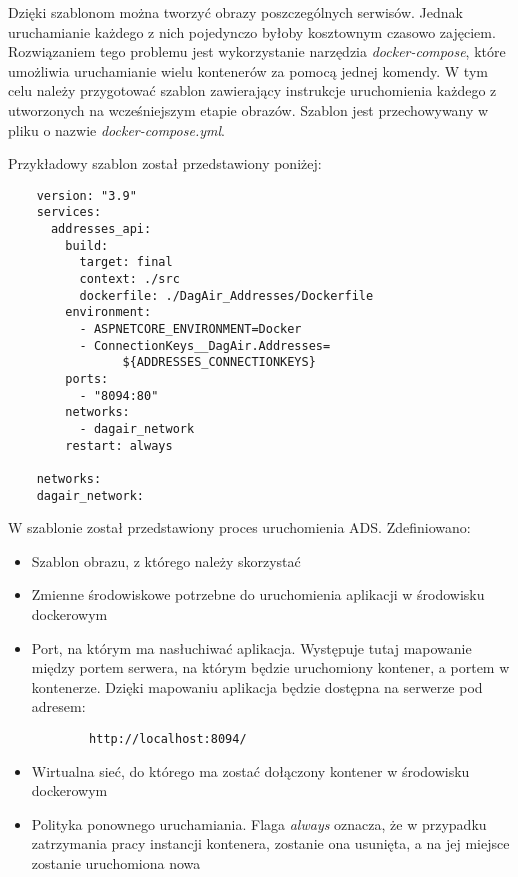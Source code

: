 Dzięki szablonom można tworzyć obrazy poszczególnych serwisów. Jednak uruchamianie każdego z nich
pojedynczo byłoby kosztownym czasowo zajęciem. Rozwiązaniem tego problemu jest wykorzystanie narzędzia
\textit{docker-compose}, które umożliwia uruchamianie wielu kontenerów za pomocą jednej komendy. W tym celu
należy przygotować szablon zawierający instrukcje uruchomienia każdego z utworzonych na wcześniejszym
etapie obrazów. Szablon jest przechowywany w pliku o nazwie \textit{docker-compose.yml}.

Przykładowy szablon został przedstawiony poniżej:

\begin{lstlisting}
    version: "3.9"
    services:
      addresses_api:
        build:
          target: final
          context: ./src
          dockerfile: ./DagAir_Addresses/Dockerfile
        environment:
          - ASPNETCORE_ENVIRONMENT=Docker
          - ConnectionKeys__DagAir.Addresses=
                ${ADDRESSES_CONNECTIONKEYS}
        ports:
          - "8094:80"
        networks:
          - dagair_network
        restart: always

    networks:
    dagair_network:
\end{lstlisting}

W szablonie został przedstawiony proces uruchomienia ADS. Zdefiniowano:

\begin{itemize}
    \item Szablon obrazu, z którego należy skorzystać
    \item Zmienne środowiskowe potrzebne do uruchomienia aplikacji w środowisku dockerowym
    \item Port, na którym ma nasłuchiwać aplikacja. Występuje tutaj mapowanie między portem 
    serwera, na którym będzie uruchomiony kontener, a portem w kontenerze. Dzięki mapowaniu
    aplikacja będzie dostępna na serwerze pod adresem:

    \begin{lstlisting}
        http://localhost:8094/
    \end{lstlisting}
    \item Wirtualna sieć, do którego ma zostać dołączony kontener w środowisku dockerowym
    \item Polityka ponownego uruchamiania. Flaga \textit{always} oznacza, że w przypadku zatrzymania pracy
    instancji kontenera, zostanie ona usunięta, a na jej miejsce zostanie uruchomiona nowa
\end{itemize}

